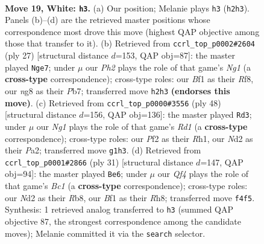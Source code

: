 \documentclass[11pt]{article}
\begin{document}
\clearpage

\begin{figure}[p]\centering
\begin{subfigure}{0.46\textwidth}\centering
\resizebox{\linewidth}{!}{%
\newchessgame
\chessboard[
  setfen={r3k1nr/bpq5/4p3/p2pPp2/b1P2Qpp/P7/RPnNKPPP/2B2BNR w kq - 4 19},
  showmover=false,
  pgfstyle=straightmove, color=movearrow, markmove={h2-h3}
]}
\caption{}
\end{subfigure}\hfill
\begin{subfigure}{0.46\textwidth}\centering
\resizebox{\linewidth}{!}{%
\newchessgame
\chessboard[
  setfen={2k2rnr/pp1b1pp1/2n1p2p/3pP2P/q1pP3N/P1P3P1/1QPB1P2/R3KB1R b KQ - 1 14},
  showmover=false,
  pgfstyle=straightmove, color=movearrow, markmove={g8-e7}
]}
\caption{}
\end{subfigure}
\\[4pt]
\begin{subfigure}{0.46\textwidth}\centering
\resizebox{\linewidth}{!}{%
\newchessgame
\chessboard[
  setfen={r1b3k1/pp2b1q1/2p1p2n/2Pp1p1n/3P1P1p/1PN3PB/P1Q1PB2/3R1K1R w - - 2 25},
  showmover=false,
  pgfstyle=straightmove, color=movearrow, markmove={d1-d3}
]}
\caption{}
\end{subfigure}\hfill
\begin{subfigure}{0.46\textwidth}\centering
\resizebox{\linewidth}{!}{%
\newchessgame
\chessboard[
  setfen={1rb1k2r/4bpp1/p2p1n1p/q3p3/1p2P1PP/5P2/PPPQNB2/1K1R1B1R b k - 1 16},
  showmover=false,
  pgfstyle=straightmove, color=movearrow, markmove={c8-e6}
]}
\caption{}
\end{subfigure}
\caption{\textbf{Move 19, White: \texttt{h3}.} (a) Our position; Melanie plays \texttt{h3} (\texttt{h2h3}). Panels (b)--(d) are the retrieved master positions whose correspondence most drove this move (highest QAP objective among those that transfer to it). (b) Retrieved from \texttt{ccrl\_top\_p0002\#2604} (ply 27) [structural distance $d$=153, QAP obj=87]: the master played \texttt{Nge7}; under $\mu$ our \emph{Ph2} plays the role of that game's \emph{Ng1} (a \textbf{cross-type} correspondence); cross-type roles: our \emph{B}f1 as their \emph{R}f8, our \emph{n}g8 as their \emph{P}b7; transferred move \texttt{h2h3} \textbf{(endorses this move)}. (c) Retrieved from \texttt{ccrl\_top\_p0000\#3556} (ply 48) [structural distance $d$=156, QAP obj=136]: the master played \texttt{Rd3}; under $\mu$ our \emph{Ng1} plays the role of that game's \emph{Rd1} (a \textbf{cross-type} correspondence); cross-type roles: our \emph{P}f2 as their \emph{R}h1, our \emph{N}d2 as their \emph{P}a2; transferred move \texttt{g1h3}. (d) Retrieved from \texttt{ccrl\_top\_p0001\#2866} (ply 31) [structural distance $d$=147, QAP obj=94]: the master played \texttt{Be6}; under $\mu$ our \emph{Qf4} plays the role of that game's \emph{Bc1} (a \textbf{cross-type} correspondence); cross-type roles: our \emph{N}d2 as their \emph{R}b8, our \emph{B}f1 as their \emph{R}h8; transferred move \texttt{f4f5}. Synthesis: 1 retrieved analog transferred to \texttt{h3} (summed QAP objective 87, the strongest correspondence among the candidate moves); Melanie committed it via the \texttt{search} selector.}
\label{fig:thought-m36}
\end{figure}
\end{document}
